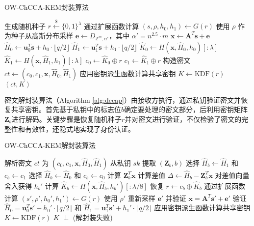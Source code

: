 \begin{algorithm}
\caption{OW-ChCCA-KEM封装算法}
\label{alg:encap}
\begin{algorithmic}[1]
    \State 生成随机种子 $r \stackrel{\$}{\leftarrow} \{0,1\}^{\lambda}$
    \State 通过扩展函数计算 $(s, \rho, h_0, h_1) \gets G(r)$
    \State 使用 $\rho$ 作为种子从高斯分布采样 $\mathbf{e} \leftarrow D_{\mathbb{Z}^m, \alpha'}$，其中 $\alpha' = n^{2.5} \cdot m$
    \State $\mathbf{x} \gets \mathbf{A}^T\mathbf{s} + \mathbf{e}$
    \State $\hat{H}_0 \gets \mathbf{u}_0^T\mathbf{s} + h_0 \cdot \lfloor q/2 \rfloor$
    \State $\hat{H}_1 \gets \mathbf{u}_1^T\mathbf{s} + h_1 \cdot \lfloor q/2 \rfloor$
    \State $\hat{K}_0 \gets H(\mathbf{x}, \hat{H}_0, h_0)[:{\lambda}]$
    \State $\hat{K}_1 \gets H(\mathbf{x}, \hat{H}_1, h_1)[:{\lambda}]$
    \State $c_0 \gets \hat{K}_0 \oplus r$
    \State $c_1 \gets \hat{K}_1 \oplus r$
    \State 构造密文 $ct \gets (c_0, c_1, \mathbf{x}, \hat{H}_0, \hat{H}_1)$
    \State 应用密钥派生函数计算共享密钥 $K \gets \text{KDF}(r)$
    \State \Return $(ct, K)$
\EndProcedure
\end{algorithmic}
\end{algorithm}

密文解封装算法（Algorithm \ref{alg:decap}）由接收方执行，通过私钥验证密文并恢复共享密钥。首先基于私钥中的标志位$b$确定要处理的密文部分，后利用密钥矩阵$\mathbf{Z}_b$进行解码。关键步骤是恢复随机种子$r$并对密文进行验证，不仅检验了密文的完整性和有效性，还隐式地实现了身份认证。

\begin{algorithm}
\caption{OW-ChCCA-KEM解封装算法}
\label{alg:decap}
\begin{algorithmic}[1]
    \State 解析密文 $ct$ 为 $(c_0, c_1, \mathbf{x}, \hat{H}_0, \hat{H}_1)$
    \State 从私钥 $sk$ 提取 $(\mathbf{Z}_b, b)$
        \State 选择 $\hat{H}_b \gets \hat{H}_1$ 和 $c_b \gets c_1$
    \Else
        \State 选择 $\hat{H}_b \gets \hat{H}_0$ 和 $c_b \gets c_0$
    \EndIf
    \State 计算 $\mathbf{Z}_b^T\mathbf{x}$
    \State 计算差值 $\Delta \gets \hat{H}_b - \mathbf{Z}_b^T\mathbf{x}$
    \State 对差值向量舍入获得 $h_b'$
    \State 计算 $\hat{K}_b \gets H(\mathbf{x}, \hat{H}_b, h_b')[:{\lambda/8}]$
    \State 恢复 $r \gets c_b \oplus \hat{K}_b$
    \State 通过扩展函数计算 $(s', \rho', h_0', h_1') \gets G(r)$
    \State 使用 $\rho'$ 重新采样 $\mathbf{e}'$ 并验证 $\mathbf{x} = \mathbf{A}^T\mathbf{s}' + \mathbf{e}'$
    \State 验证 $\hat{H}_0 = \mathbf{u}_0^T\mathbf{s}' + h_0' \cdot \lfloor q/2 \rfloor$ 和 $\hat{H}_1 = \mathbf{u}_1^T\mathbf{s}' + h_1' \cdot \lfloor q/2 \rfloor$
        \State 应用密钥派生函数计算共享密钥 $K \gets \text{KDF}(r)$
        \State \Return $K$
    \Else
        \State \Return $\perp$ (解封装失败)
    \EndIf
\EndProcedure
\end{algorithmic}
\end{algorithm}